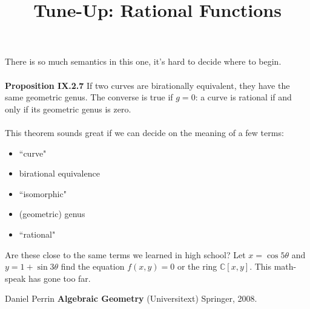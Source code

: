 \documentclass[12pt]{article}
\title{Tune-Up: Rational Functions}
\date{}
\begin{document}
\sffamily

\maketitle

\noindent There is so much semantics in this one, it's hard to decide where to begin. \\ \\
\textbf{Proposition IX.2.7} {\color{black!25!white}If two curves are birationally equivalent, they have the same geometric genus.  The converse is true if $g = 0$:} a curve is rational if and only if its geometric genus is zero. \\ \\
This theorem sounds great if we can decide on the meaning of a few terms:
\begin{itemize}
\item ``curve"
\item birational equivalence
\item ``isomorphic"
\item (geometric) genus
\item ``rational"
\end{itemize} 
Are these close to the same terms we learned in high school?  Let $x = \cos 5\theta$ and $y = 1 + \sin 3 \theta$ find the equation $f(x,y) = 0$ or the ring $\mathbb{C}[x,y]$.  This math-speak has gone too far.
\vfill



\begin{thebibliography}{}
\item Daniel Perrin \textbf{Algebraic Geometry} (Universitext) Springer, 2008.
\end{thebibliography}
\end{document}

